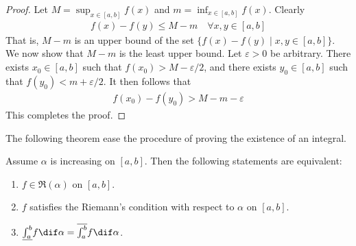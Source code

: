 \documentclass[thmcnt=section, color=blue, 12pt]{my-elegantbook}
\begin{document}
\begin{proof}
	Let $M = \sup_{x \in [a, b]} f(x)$ and $m = \inf_{x \in [a, b]} f(x)$.
	Clearly
	\begin{align*}
		f(x) - f(y) \leq M - m \quad \forall x, y \in [a, b]
	\end{align*}
	That is, $M-m$ is an upper bound of the
	set $\{f(x) - f(y) \mid x, y \in [a, b]\}$.
	We now show that $M - m$ is the least upper bound.
	Let $\varepsilon > 0$ be arbitrary.
	There exists $x_0 \in [a, b]$ such that $f(x_0) > M - \varepsilon/2$,
	and there exists $y_0 \in [a, b]$ such that $f(y_0) < m + \varepsilon/2$.
	It then follows that
	\begin{align*}
		f(x_0) - f(y_0) > M - m - \varepsilon
	\end{align*}
	This completes the proof.
\end{proof}

The following theorem ease the procedure of proving
the existence of an integral.

\begin{theorem}
	Assume $\alpha$ is increasing on $[a, b]$.
	Then the following statements are equivalent:
	\begin{enumerate}
		\item $f \in \mathfrak{R}(\alpha)$ on $[a, b]$.
		\item $f$ satisfies the Riemann's condition with respect to $\alpha$ on $[a, b]$.
		\item $\underline{\int_a^b} f \dif \alpha = \overline{\int_a^b} f \dif \alpha$.
	\end{enumerate}
\end{theorem}
\end{document}
